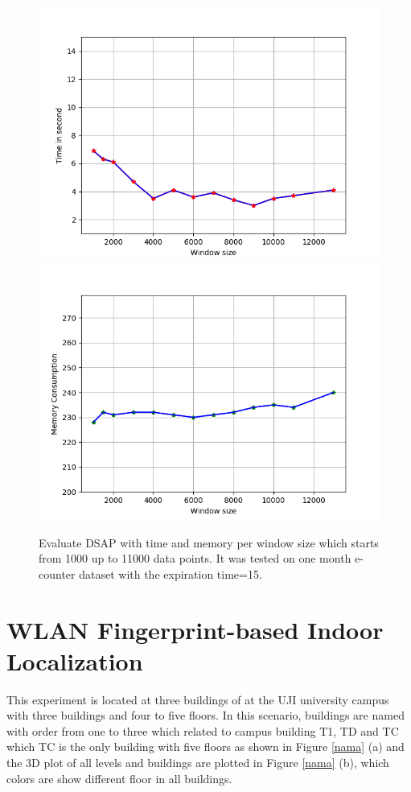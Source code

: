 \begin{figure}[!h]
    \centering
    \includegraphics[width = 7.5 cm]{image/Chapters/Chapter6/time.point.lessinitial.png}\hfill
    \includegraphics[width = 7.5 cm]{image/Chapters/Chapter6/mem.point.lessinitial.png}
    \\[\smallskipamount]    
    \caption{ Evaluate DSAP with time and memory per window size which starts from 1000 up to 11000 data points. It was tested on one month e-counter dataset with the expiration time=15.}
    \label{4}
\end{figure}












\section{WLAN Fingerprint-based Indoor Localization}

This experiment is located at three buildings of at the UJI university campus with three buildings and four to five floors. In this scenario, buildings are named with order from one to three which related to campus building T1, TD and TC which TC is the only building with five floors as shown in Figure \ref{nama} (a) and the 3D plot of all levels and buildings are plotted in Figure \ref{nama} (b), which colors are show different floor in all buildings. 

